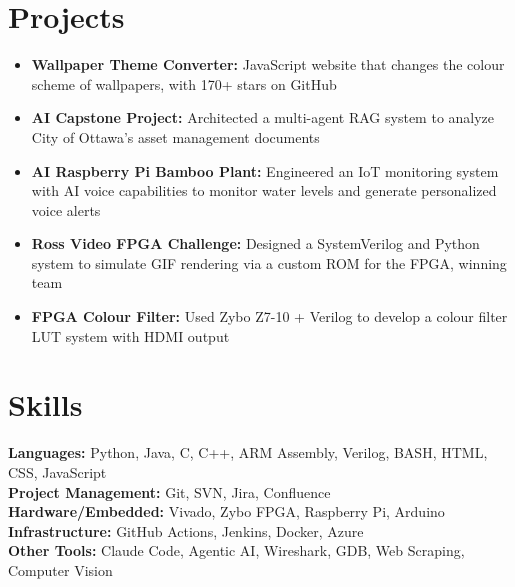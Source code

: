\documentclass[11pt]{article}       %
\begin{document}
 \section*{Projects}
 \begin{itemize}
   \item \textbf{Wallpaper Theme Converter:} JavaScript website that changes the colour scheme of wallpapers, with 170+ stars on GitHub
   \item \textbf{AI Capstone Project:} Architected a multi-agent RAG system to analyze City of Ottawa's asset management documents
   \item \textbf{AI Raspberry Pi Bamboo Plant:} Engineered an IoT monitoring system with AI voice capabilities to monitor water levels and generate personalized voice alerts
   \item \textbf{Ross Video FPGA Challenge:} Designed a SystemVerilog and Python system to simulate GIF rendering via a custom ROM for the FPGA, winning team 
   \item \textbf{FPGA Colour Filter:} Used Zybo Z7-10 + Verilog to develop a colour filter LUT system with HDMI output
 \end{itemize}

\vspace{-20.5pt}

\section*{Skills}
\textbf{Languages:} Python, Java, C, C++, ARM Assembly, Verilog, BASH, HTML, CSS, JavaScript\\
\textbf{Project Management:} Git, SVN, Jira, Confluence\\ 
\textbf{Hardware/Embedded:} Vivado, Zybo FPGA, Raspberry Pi, Arduino\\
\textbf{Infrastructure:} GitHub Actions, Jenkins, Docker, Azure\\
\textbf{Other Tools:} Claude Code, Agentic AI, Wireshark, GDB, Web Scraping, Computer Vision
\end{document}
